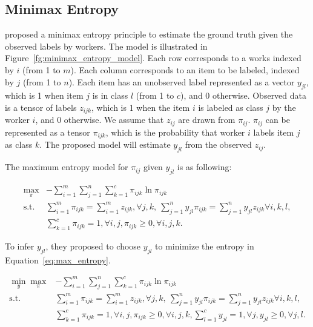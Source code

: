 \documentclass{article}
\begin{document}
\subsection{Minimax Entropy}
\cite{Zhou2012-ry} proposed a minimax entropy principle to estimate
the ground truth given the observed labels by workers. The model is
illustrated in Figure~\ref{fg:minimax_entropy_model}. Each row
corresponds to a works indexed by $i$ (from 1 to $m$). Each column
corresponds to an item to be labeled, indexed by $j$ (from 1 to
$n$). Each item has an unobserved label represented as a vector
$y_{jl}$, which is 1 when item $j$ is in class $l$ (from 1 to $c$),
and 0 otherwise. Observed data is a tensor of labels $z_{ijk}$, which
is 1 when the item $i$ is labeled as class $j$ by the worker $i$, and
0 otherwise. We assume that $z_{ij}$ are drawn from
$\pi_{ij}$. $\pi_{ij}$ can be represented as a tensor $\pi_{ijk}$,
which is the probability that worker $i$ labels item $j$ as class
$k$. The proposed model will estimate $y_{jl}$ from the observed
$z_{ij}$.

The maximum entropy model for $\pi_{ij}$ given $y_{jl}$ is as
following:

\begin{align}
\max_{\pi} & -\sum_{i=1}^{m}\sum_{j=1}^{n}\sum_{k=1}^{c} \pi_{ijk}
\ln \pi_{ijk} \nonumber \\
  \mathrm{s.t.} & \sum_{i=1}^{m}\pi_{ijk} = \sum_{i=1}^{m}z_{ijk},
                  \forall j,k, ~ \sum_{j=1}^{n}y_{jl}\pi_{ijk} =
                  \sum_{j=1}^{n}y_{jl}z_{ijk} \forall i,k,l, \nonumber
  \\
  & \sum_{k=1}^{c}\pi_{ijk}=1, \forall i,j, \pi_{ijk} \geq 0, \forall
    i,j,k. \label{eq:max_entropy}
\end{align}

To infer $y_{jl}$, they proposed to choose $y_{jl}$ to minimize the
entropy in Equation~\ref{eq:max_entropy}.

\begin{align}
\min_{y}\max_{\pi} & -\sum_{i=1}^{m}\sum_{j=1}^{n}\sum_{k=1}^{c} \pi_{ijk}
\ln \pi_{ijk} \nonumber \\
  \mathrm{s.t.} & \sum_{i=1}^{m}\pi_{ijk} = \sum_{i=1}^{m}z_{ijk},
                  \forall j,k, ~ \sum_{j=1}^{n}y_{jl}\pi_{ijk} =
                  \sum_{j=1}^{n}y_{jl}z_{ijk} \forall i,k,l, \nonumber
  \\
  & \sum_{k=1}^{c}\pi_{ijk}=1, \forall i,j, \pi_{ijk} \geq 0, \forall
    i,j,k, \sum_{l=1}^{c}y_{jl}=1, \forall j, y_{jl} \geq 0, \forall
    j, l. \label{eq:minimax_entropy}
\end{align}



\end{document}
